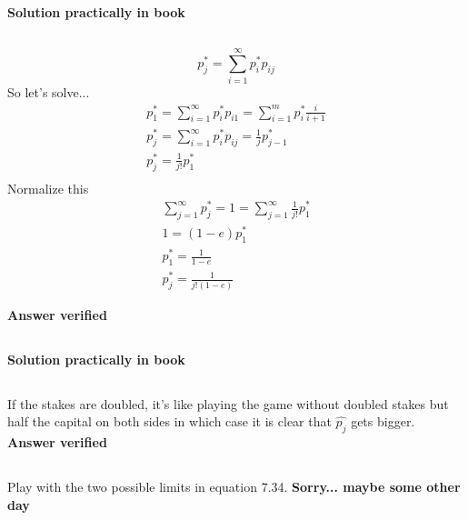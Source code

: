 \subsection{}

\textbf{Solution practically in book}

\subsection{}
\begin{equation}
	p_j^* = \sum_{i=1}^{\infty} p_i^* p_{ij}
\end{equation}
So let's solve...
\begin{eqnarray}
	p_1^* = \sum_{i=1}^{\infty} p_i^* p_{i1} = \sum_{i=1}^{m} p_i^* \frac{i}{i+1} \\
	p_j^* = \sum_{i=1}^{\infty} p_i^* p_{ij} = \frac{1}{j} p^*_{j-1} \\
	p_j^* = \frac{1}{j!} p_1^* \\
\end{eqnarray}
Normalize this
\begin{eqnarray}
	\sum_{j=1}^{\infty} p_j^* = 1 = \sum_{j=1}^{\infty} \frac{1}{j!} p_1^* \\
	1 = (1-e)p_1^* \\
	p_1^* = \frac{1}{1-e} \\
	p_j^* = \frac{1}{j!(1-e)} 
\end{eqnarray}

\textbf{Answer verified}

\subsection{}

\textbf{Solution practically in book}
\subsection{}
If the stakes are doubled, it's like playing the game without doubled stakes but half the capital on both sides in which case it is clear that $\hat{p_j}$ gets bigger.
\textbf{Answer verified}

\subsection{}
Play with the two possible limits in equation 7.34.
\textbf{Sorry... maybe some other day}
%
%
%	





